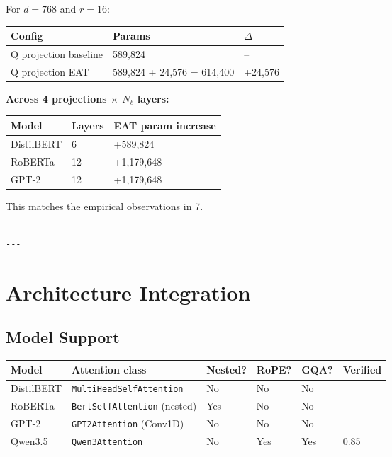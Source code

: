 For $d = 768$ and $r = 16$:

\begin{table}[H]
\centering
\small
\begin{tabular}{lll}
\toprule
\textbf{Config} & \textbf{Params} & \textbf{$\Delta$} \\
\midrule
Q projection baseline & 589,824 & -- \\
Q projection EAT & 589,824 + 24,576 = 614,400 & +24,576 \\
\bottomrule
\end{tabular}
\end{table}

\textbf{Across 4 projections $\times$ $N_\ell$ layers:}

\begin{table}[H]
\centering
\small
\begin{tabular}{lll}
\toprule
\textbf{Model} & \textbf{Layers} & \textbf{EAT param increase} \\
\midrule
DistilBERT & 6 & +589,824 \\
RoBERTa & 12 & +1,179,648 \\
GPT-2 & 12 & +1,179,648 \\
\bottomrule
\end{tabular}
\end{table}

This matches the empirical observations in  7.
\begin{lstlisting}

---
\end{lstlisting}


\section{Architecture Integration}

\subsection{Model Support}

\begin{table}[H]
\centering
\small
\begin{tabular}{llllll}
\toprule
\textbf{Model} & \textbf{Attention class} & \textbf{Nested?} & \textbf{RoPE?} & \textbf{GQA?} & \textbf{Verified} \\
\midrule
DistilBERT & \texttt{MultiHeadSelfAttention} & No & No & No &  \\
RoBERTa & \texttt{BertSelfAttention} (nested) & Yes & No & No &  \\
GPT-2 & \texttt{GPT2Attention} (Conv1D) & No & No & No &  \\
Qwen3.5 & \texttt{Qwen3Attention} & No & Yes & Yes & 0.85 \\
\bottomrule
\end{tabular}
\end{table}

